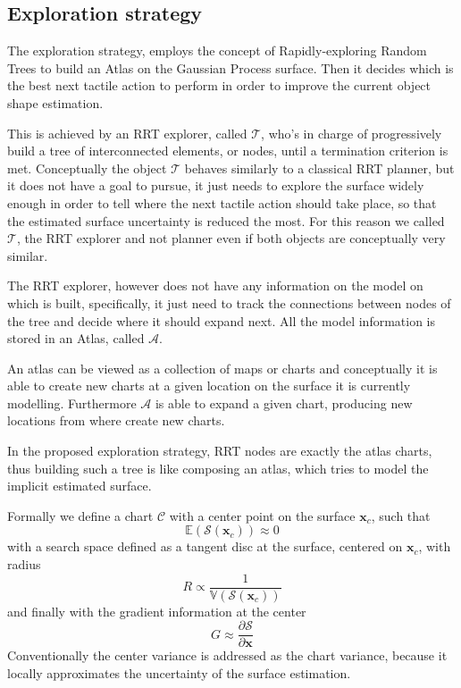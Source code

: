 \subsection{Exploration strategy}
\label{sec:strategy}



The exploration strategy, employs  the concept of Rapidly-exploring Random Trees to build
an Atlas on  the Gaussian Process surface. Then  it decides which
is  the  best next  tactile  action  to perform  in  order to improve the  current
object shape estimation.



This is achieved by an RRT explorer, called $\mathcal{T}$, who's in charge
of progressively build a tree of interconnected elements, or nodes,  until a termination criterion is met.
Conceptually the object $\mathcal{T}$ behaves similarly to a classical RRT planner,
but it does not have a goal to pursue, it just needs to explore the surface widely
enough in order to tell where the next tactile action should take place, so that
the estimated surface uncertainty is reduced the most.
For this reason we called $\mathcal{T}$, the RRT explorer and not planner even if
both objects are conceptually very similar.

The RRT explorer, however does not have any information on the model on which is built, specifically,
it just need to track the connections between nodes of the tree and decide where it
should expand next. All the model information is stored in an Atlas, called $\mathcal{A}$.

An atlas can be viewed as a collection of maps or charts and conceptually it is able
to create new charts at a given location on the surface it is currently modelling.
Furthermore $\mathcal{A}$ is able to expand a given chart, producing new locations
from where create new charts.

In the proposed exploration strategy, RRT nodes are exactly the atlas charts, thus
building such a tree is like composing an atlas, which tries to model the implicit
estimated surface.

Formally we define a chart $\mathcal{C}$ with a center point on the surface $\mathbf{x}_{c}$,
such that
$$
\mathbb{E}(\mathcal{S}(\mathbf{x}_c)) \approx 0
$$
with a search space defined as a
tangent disc at the surface, centered on $\mathbf{x}_c$, with radius 
$$
R \propto \frac{1}{\mathbb{V}(\mathcal{S}(\mathbf{x}_c))}
$$ 
and finally with the gradient information at the center 
$$
G \approx \frac{\partial \mathcal{S}}{\partial \mathbf{x}}
$$
Conventionally the center variance is addressed as the chart variance, because
it locally approximates the uncertainty of the surface estimation.

